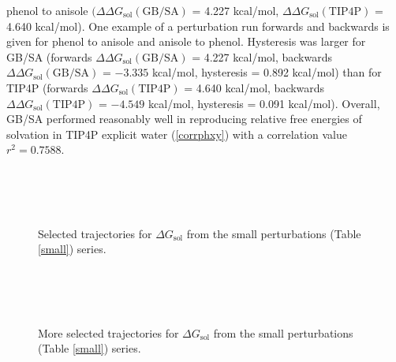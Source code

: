\documentclass[12pt]{report}
\begin{document}
phenol to anisole 
$(\Delta\Delta G_{ \textrm{sol}}(\textrm{GB/SA})$ = 4.227 kcal/mol, 
$\Delta\Delta G_{ \textrm{sol}}(\textrm{TIP4P})$ = 4.640 kcal/mol). 
One example of a perturbation run forwards and backwards is given for phenol to anisole and anisole to phenol. 
Hysteresis was larger for GB/SA (forwards 
$\Delta\Delta G_{ \textrm{sol}}(\textrm{GB/SA})$ = 4.227 kcal/mol, backwards 
$\Delta\Delta G_{ \textrm{sol}}(\textrm{GB/SA})$ = $-3.335$ kcal/mol, 
hysteresis = 0.892 kcal/mol) 
than for TIP4P (forwards 
$\Delta\Delta G_{ \textrm{sol}}(\textrm{TIP4P})$ = 4.640 kcal/mol, backwards 
$\Delta\Delta G_{ \textrm{sol}}(\textrm{TIP4P})$ = $-4.549$ kcal/mol, 
hysteresis = 0.091 kcal/mol). 
Overall, GB/SA performed reasonably well in reproducing relative free energies of solvation in TIP4P explicit water (\cref{corrphxy}) with a correlation value $r^{2} = 0.7588$. 

\begin{figure}[p]
\centering
\hspace*{-1.3cm}\\
\hspace*{-1.3cm}\\
\hspace*{-1.3cm}\\
\caption{Selected trajectories for $\Delta G_\textrm{sol}$ from the small perturbations (Table \ref{small}) series.}
\label{dgsolsm1}
\end{figure}

\begin{figure}[p]
\centering
\hspace*{-1.3cm}\\
\hspace*{-1.3cm}\\
\hspace*{-1.3cm}\\
\caption{More selected trajectories for $\Delta G_\textrm{sol}$ from the small perturbations (Table \ref{small}) series.}
\label{dgsolsm2}
\end{figure}
\end{document}

